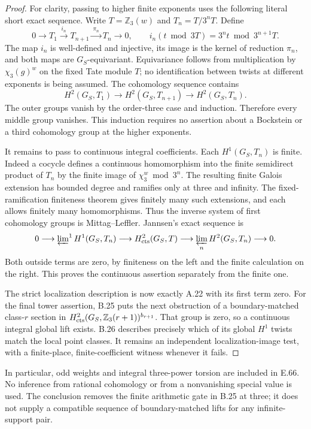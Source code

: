 \begin{proof}
For clarity, passing to higher finite exponents uses the
following literal short exact sequence. Write
$T=\mathbb Z_3(w)$ and $T_n=T/3^nT$. Define
\[
 0\longrightarrow T_1
 \xrightarrow{\ i_n\ }T_{n+1}
 \xrightarrow{\ \pi_n\ }T_n\longrightarrow0,
 \qquad
 i_n(t\bmod3T)=3^nt\bmod3^{n+1}T .
\]
The map $i_n$ is well-defined and injective, its image is the
kernel of reduction $\pi_n$, and both maps are $G_S$-equivariant.
Equivariance follows from multiplication by
$\chi_3(g)^w$ on the fixed Tate module $T$; no identification
between twists at different exponents is being assumed.
The cohomology sequence contains
\[
 H^2(G_S,T_1)\longrightarrow H^2(G_S,T_{n+1})
                  \longrightarrow H^2(G_S,T_n).
\]
The outer groups vanish by the order-three case and induction.
Therefore every middle group vanishes. This induction requires
no assertion about a Bockstein or a third cohomology group at
the higher exponents.

It remains to pass to continuous integral coefficients. Each
$H^1(G_S,T_n)$ is finite. Indeed a cocycle defines a continuous
homomorphism into the finite semidirect product of $T_n$ by
the finite image of $\chi_3^w\bmod3^n$. The resulting finite
Galois extension has bounded degree and ramifies only at three
and infinity. The fixed-ramification finiteness theorem
\cite[Theorem 8.42, p.151]{CohMilneANT} gives finitely many
such extensions, and each allows finitely many homomorphisms.
Thus the inverse system of first cohomology groups is
Mittag--Leffler. Jannsen's exact sequence
\cite[(2.1) and Theorem 2.2, p.215]{CohJannsen1988} is
\[
 0\longrightarrow\varprojlim\nolimits^1H^1(G_S,T_n)
 \longrightarrow H^2_{\rm cts}(G_S,T)
 \longrightarrow\varprojlim_n H^2(G_S,T_n)\longrightarrow0.
\]
Both outside terms are zero, by finiteness on the left and
the finite calculation on the right. This proves the
continuous assertion separately from the finite one.

The strict localization description is now exactly A.22 with
its first term zero. For the final tower assertion, B.25
puts the next obstruction of a boundary-matched class-$r$
section in
$H^2_{\rm cts}(G_S,\mathbb Z_3(r+1))^{b_{r+1}}$.
That group is zero, so a continuous integral global lift
exists. B.26 describes precisely which of its global
$H^1$ twists match the local point classes. It remains an
independent localization-image test, with a finite-place,
finite-coefficient witness whenever it fails.
\end{proof}

In particular, odd weights and integral three-power torsion
are included in E.66. No inference from rational
cohomology or from a nonvanishing special value is used.
The conclusion removes the finite arithmetic gate in B.25
at three; it does not supply a compatible sequence of
boundary-matched lifts for any infinite-support pair.

